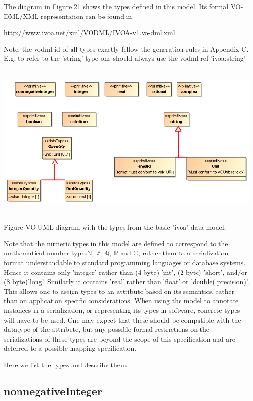 \documentclass[10pt,a4paper]{ivoa}
\begin{document}
The diagram in Figure 21 shows the types defined in this model. Its
formal VO-DML/XML representation can be found in

\url{http://www.ivoa.net/xml/VODML/IVOA-v1.vo-dml.xml}.

Note, the vodml-id of all types exactly follow the generation rules in
Appendix C. E.g. to refer to the 'string' type one should always use the
vodml-ref 'ivoa:string'

\includegraphics[width=6in,height=3.06956in]{./media/image23.png}

Figure VO-UML diagram with the types from the basic 'ivoa' data model.

Note that the numeric types in this model are defined to correspond to
the mathematical number types\(\mathbb{N}\), \(\mathbb{Z}\),
\(\mathbb{Q}\), \(\mathbb{R}\) and \(\mathbb{C}\), rather than to a
serialization format understandable to standard programming languages or
database systems. Hence it contains only 'integer' rather than (4 byte)
'int', (2 byte) 'short', and/or (8 byte)'long'. Similarly it contains
'real' rather than 'float' or 'double( precision)'. This allows one to
assign types to an attribute based on its semantics, rather than on
application specific considerations. When using the model to annotate
instances in a serialization, or representing its types in software,
concrete types will have to be used. One may expect that these should be
compatible with the datatype of the attribute, but any possible formal
restrictions on the serializations of these types are beyond the scope
of this specification and are deferred to a possible mapping
specification.

Here we list the types and describe them.

\hypertarget{nonnegativeinteger}{%
\subsection{nonnegativeInteger}\label{nonnegativeinteger}}
\end{document}
